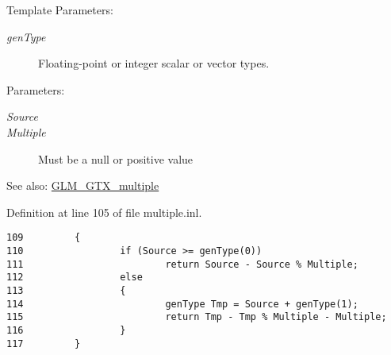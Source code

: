 \begin{Desc}
\item[Template Parameters:]
\begin{description}
\item[{\em genType}]Floating-point or integer scalar or vector types. \end{description}
\end{Desc}
\begin{Desc}
\item[Parameters:]
\begin{description}
\item[{\em Source}]\item[{\em Multiple}]Must be a null or positive value\end{description}
\end{Desc}
\begin{Desc}
\item[See also:]\hyperlink{group__gtx__multiple}{GLM\_\-GTX\_\-multiple} \end{Desc}


Definition at line 105 of file multiple.inl.

\begin{Code}\begin{verbatim}109         {
110                 if (Source >= genType(0))
111                         return Source - Source % Multiple;
112                 else
113                 {
114                         genType Tmp = Source + genType(1);
115                         return Tmp - Tmp % Multiple - Multiple;
116                 }
117         }
\end{verbatim}
\end{Code}


